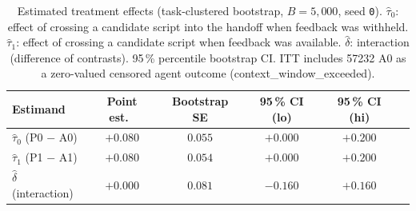 \begin{table}[ht]
\centering
\caption{Estimated treatment effects (task-clustered bootstrap, $B=5,000$, seed \texttt{0}).
  $\hat\tau_0$: effect of crossing a candidate script into the handoff when feedback was withheld.
  $\hat\tau_1$: effect of crossing a candidate script when feedback was available.
  $\hat\delta$: interaction (difference of contrasts).
  95\,\% percentile bootstrap CI.
  ITT includes 57232 A0 as a zero-valued censored agent outcome (context_window_exceeded).
}
\label{tab:effects}
\begin{tabular}{lccccc}
\toprule
Estimand & Point est.\ & Bootstrap SE & 95\,\% CI (lo) & 95\,\% CI (hi) \\
\midrule
  $\hat\tau_0$ (P0 $-$ A0) & $+0.080$ & $0.055$ & $+0.000$ & $+0.200$ \\
  $\hat\tau_1$ (P1 $-$ A1) & $+0.080$ & $0.054$ & $+0.000$ & $+0.200$ \\
  $\hat\delta$ (interaction) & $+0.000$ & $0.081$ & $-0.160$ & $+0.160$ \\
\bottomrule
\end{tabular}
\end{table}
